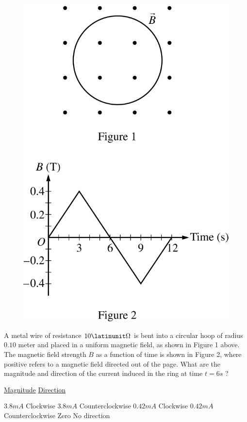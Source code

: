\begin{figure}[H]
\centering
\includegraphics[scale=0.4]{images/img-015-022.png}
\end{figure}

\begin{questions}\setcounter{question}{32}\question
A metal wire of resistance $10 \latinunit\Omega$ is bent into a circular hoop of radius $0.10$ meter and placed in a uniform magnetic field, as shown in Figure 1 above. The magnetic field strength $B$ as a function of time is shown in Figure 2, where positive refers to a magnetic field directed out of the page. What are the magnitude and direction of the current induced in the ring at time $t=6 \unit{s}$ ?

\tabto{0.75cm}\underline{Magnitude}
\tabto{4.00cm}\underline{Direction}

\begin{choices}
\choice $3.8  \unit{mA}$ \tabto{3.25cm} Clockwise
\choice $3.8  \unit{mA}$ \tabto{3.25cm} Counterclockwise
\choice $0.42 \unit{mA}$ \tabto{3.25cm} Clockwise
\choice $0.42 \unit{mA}$ \tabto{3.25cm} Counterclockwise
\choice Zero             \tabto{3.25cm} No direction
\end{choices}\end{questions}
